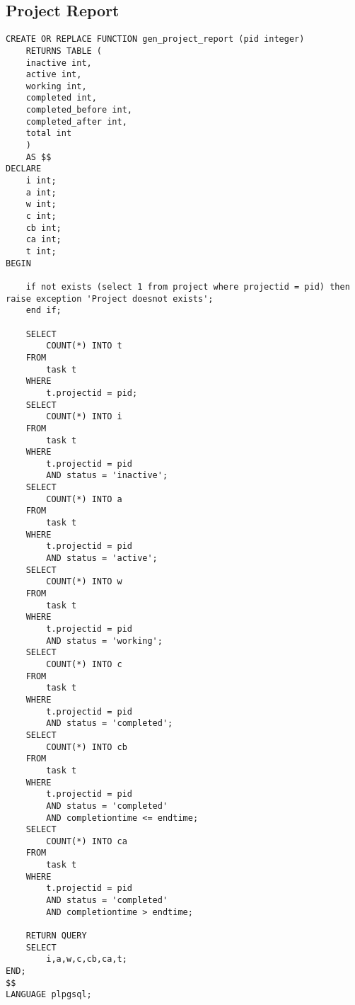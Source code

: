 \documentclass[conference,onecolumn]{IEEEtran}
\begin{document}
\subsection{Project Report}
\begin{verbatim}
CREATE OR REPLACE FUNCTION gen_project_report (pid integer)
    RETURNS TABLE (
    inactive int,
    active int,
    working int,
    completed int,
    completed_before int,
    completed_after int,
    total int
    )
    AS $$
DECLARE
    i int;
    a int;
    w int;
    c int;
    cb int;
    ca int;
    t int;
BEGIN

    if not exists (select 1 from project where projectid = pid) then raise exception 'Project doesnot exists';
    end if;

    SELECT
        COUNT(*) INTO t
    FROM
        task t
    WHERE
        t.projectid = pid;
    SELECT
        COUNT(*) INTO i
    FROM
        task t
    WHERE
        t.projectid = pid
        AND status = 'inactive';
    SELECT
        COUNT(*) INTO a
    FROM
        task t
    WHERE
        t.projectid = pid
        AND status = 'active';
    SELECT
        COUNT(*) INTO w
    FROM
        task t
    WHERE
        t.projectid = pid
        AND status = 'working';
    SELECT
        COUNT(*) INTO c
    FROM
        task t
    WHERE
        t.projectid = pid
        AND status = 'completed';
    SELECT
        COUNT(*) INTO cb
    FROM
        task t
    WHERE
        t.projectid = pid
        AND status = 'completed'
        AND completiontime <= endtime;
    SELECT
        COUNT(*) INTO ca
    FROM
        task t
    WHERE
        t.projectid = pid
        AND status = 'completed'
        AND completiontime > endtime;

    RETURN QUERY
    SELECT
        i,a,w,c,cb,ca,t;
END;
$$
LANGUAGE plpgsql;
\end{verbatim}
\end{document}
